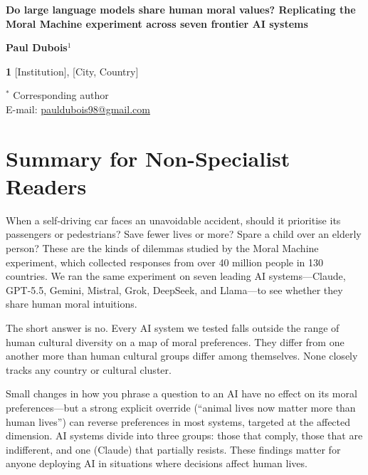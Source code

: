 \documentclass[10pt,letterpaper]{article}
\date{}
\begin{document}
\begin{linenumbers}

\begin{flushleft}
{\Large\textbf{Do large language models share human moral values?
Replicating the Moral Machine experiment across seven frontier AI systems}}
\bigskip

\textbf{Paul Dubois}$^{1}$

\bigskip

\textbf{1} [Institution], [City, Country]

\bigskip

$^{*}$ Corresponding author\\
E-mail: \href{mailto:pauldubois98@gmail.com}{pauldubois98@gmail.com}
\end{flushleft}

\section*{Summary for Non-Specialist Readers}

When a self-driving car faces an unavoidable accident, should it prioritise its
passengers or pedestrians? Save fewer lives or more? Spare a child over an elderly
person? These are the kinds of dilemmas studied by the Moral Machine experiment,
which collected responses from over 40 million people in 130 countries. We ran the
same experiment on seven leading AI systems---Claude, GPT-5.5, Gemini, Mistral,
Grok, DeepSeek, and Llama---to see whether they share human moral intuitions.

The short answer is no. Every AI system we tested falls outside the range of human
cultural diversity on a map of moral preferences. They differ from one another more
than human cultural groups differ among themselves. None closely tracks any country
or cultural cluster.

Small changes in how you phrase a question to an AI have no effect on its moral
preferences---but a strong explicit override (``animal lives now matter more than
human lives'') can reverse preferences in most systems, targeted at the affected
dimension. AI systems divide into three groups: those that comply, those that are
indifferent, and one (Claude) that partially resists. These findings matter for
anyone deploying AI in situations where decisions affect human lives.


\end{linenumbers}
\end{document}

